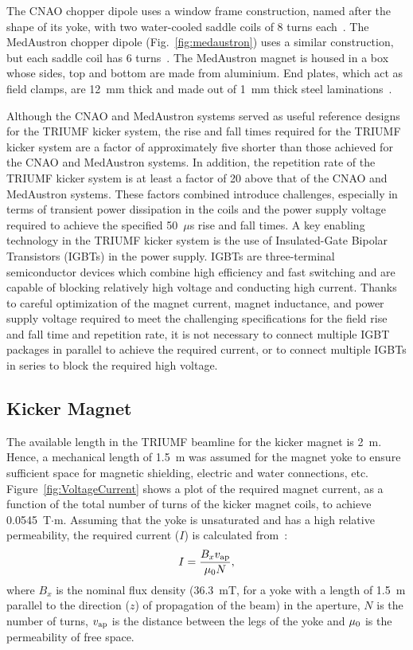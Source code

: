 \documentclass[aps,prab,twocolumn,superscriptaddress]{revtex4-1}
\begin{document}
The CNAO chopper dipole uses a window frame construction, named after the shape of its yoke, with
two water-cooled saddle coils of 8 turns each~\cite{Dallago2006}. The
MedAustron chopper dipole (Fig.~\ref{fig:medaustron}) uses a similar construction, but each
saddle coil has 6 turns~\cite{Miro-thesis}. The MedAustron magnet is
housed in a box whose sides, top and bottom are made from 
aluminium. End plates, which act as field clamps, are 12~mm thick and
made out of 1~mm thick steel
laminations~\cite{Kramer2011,Miro-thesis}.  

Although the CNAO and MedAustron systems served as
useful reference designs for the TRIUMF kicker system, the rise and fall times required for the TRIUMF kicker system are a factor of approximately five shorter than those achieved for the CNAO and MedAustron systems. In addition, the repetition rate of the TRIUMF kicker system is at least a factor of 20 above that of the CNAO and MedAustron systems. These factors combined introduce challenges, especially in terms of transient power dissipation in the coils and the power supply voltage required to achieve the specified 50~$\mu$s rise and fall times. A key enabling technology in the TRIUMF kicker system is the use of Insulated-Gate Bipolar Transistors
(IGBTs) in the power supply. IGBTs are three-terminal semiconductor devices which combine high efficiency and fast switching and are capable of blocking relatively high voltage and conducting high current. Thanks to careful optimization of
the magnet current, magnet inductance, and power supply
voltage required to meet the challenging specifications for the field rise and fall time and repetition rate, it is not necessary to connect multiple IGBT packages in parallel to achieve the required current, or to connect multiple IGBTs in series to block the required high voltage.


\subsection{Kicker Magnet\label{sec:kickermagnet}}
The available length in the TRIUMF beamline for  the kicker magnet is 2~m. Hence, a mechanical length of 1.5~m was assumed for the magnet yoke to ensure sufficient space for magnetic shielding, electric and water connections, etc. Figure~\ref{fig:VoltageCurrent} shows a plot of the required magnet current, as a function of the total number of turns of the kicker magnet coils, to achieve 0.0545~T$\cdot$m. Assuming that the yoke is unsaturated and has a high relative permeability, the required current ($I$) is calculated from~\cite{Barnes:CAS2017}:
\begin{equation}\label{Ieqn}
I = \frac{B_x v_{\rm{ap}}} {\mu_{\rm{0}} N},
\end{equation}
where $B_x$ is the nominal  flux density (36.3~mT, for a yoke with a length of 1.5~m parallel to the direction ($z$) of propagation of the beam) in the aperture, $N$ is the number of turns, $v_{\rm{ap}}$ is the distance between the legs of the yoke %
and $\mu_{\rm{0}}$ is the permeability of free space. 
\end{document}
